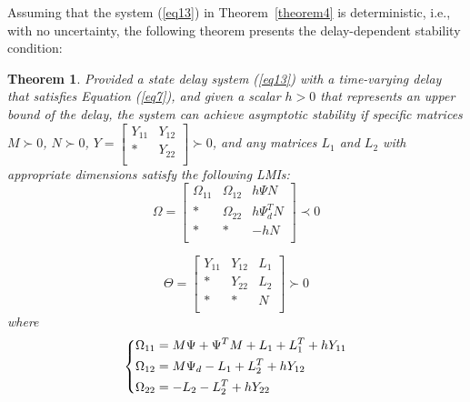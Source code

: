 \documentclass[a4paper]{cas-sc}
\newtheorem{theorem}{Theorem}
\begin{document}
Assuming that the system (\ref{eq13}) in Theorem~\ref{theorem4} is deterministic, i.e., with no uncertainty, the following theorem presents the delay-dependent stability condition:
\begin{theorem}
  \label{theorem6}
  Provided a state delay system (\ref{eq13}) with a time-varying delay that satisfies Equation (\ref{eq7}), and given a scalar $h>0$ that represents an upper bound of the delay, the system can achieve asymptotic stability if specific matrices $M\succ0$, $N\succ0$, $Y=\left[\begin{matrix}Y_{11}&Y_{12}\\\ast&Y_{22}\\\end{matrix}\right]\succ0$, and any matrices $L_1$ and $L_2$ with appropriate dimensions satisfy the following LMIs:
\begin{equation}
\Omega=\left[\begin{matrix}\Omega_{11}&\Omega_{12}&h\Psi N\\\ast&\Omega_{22}&h\Psi_d^TN\\\ast&\ast&-hN\\\end{matrix}\right]\prec0
\label{eq18}
\end{equation}

\begin{equation}  \Theta=\left[\begin{matrix}Y_{11}&Y_{12}&L_1\\\ast&Y_{22}&L_2\\\ast&\ast&N\\\end{matrix}\right]\succ0    
  \label{eq19}
\end{equation}    
where
\begin{equation}
  \left\{ \begin{gathered}
    {\Omega _{11}} = M\Psi  + {\Psi ^T}M + {L_1} + L_1^T + h{Y_{11}} \hfill \\
    {\Omega _{12}} = M{\Psi _d} - {L_1} + L_2^T + h{Y_{12}} \hfill \\
    {\Omega _{22}} =  - {L_2} - L_2^T + h{Y_{22}} \hfill \\ 
  \end{gathered}  \right.
    \label{eq20}
\end{equation}
\end{theorem}
\end{document}
